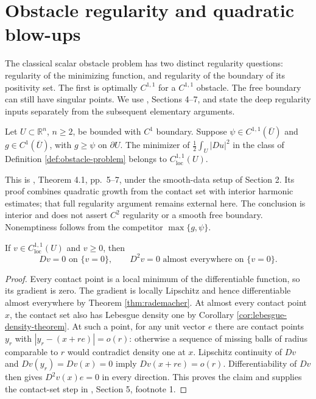 \chapter{Obstacle regularity and quadratic blow-ups}\label{sec:obstacle-blowups}
The classical scalar obstacle problem has two distinct regularity questions: regularity of the minimizing function, and regularity of the boundary of its positivity set. The first is optimally $C^{1,1}$ for a $C^{1,1}$ obstacle. The free boundary can still have singular points. We use \cite{Fig18}, Sections 4--7, and state the deep regularity inputs separately from the subsequent elementary arguments.

\begin{theorem}\label{thm:obstacle-optimal-regularity}
Let $U\subset\mathbb R^n$, $n\geq2$, be bounded with $C^1$ boundary. Suppose $\psi\in C^{1,1}(\overline U)$ and $g\in C^1(\overline U)$, with $g\geq\psi$ on $\partial U$. The minimizer of $\frac12\int_U|Du|^2$ in the class of Definition \ref{def:obstacle-problem} belongs to $C^{1,1}_{\mathrm{loc}}(U)$.

This is \cite{Fig18}, Theorem 4.1, pp.~5--7, under the smooth-data setup of Section 2. Its proof combines quadratic growth from the contact set with interior harmonic estimates; that full regularity argument remains external here. The conclusion is interior and does not assert $C^2$ regularity or a smooth free boundary. Nonemptiness follows from the competitor $\max\{g,\psi\}$.
\end{theorem}

\begin{lemma}\label{lem:contact-hessian-zero}
If $v\in C^{1,1}_{\mathrm{loc}}(U)$ and $v\geq0$, then
\[
 Dv=0\text{ on }\{v=0\},\qquad
 D^2v=0\text{ almost everywhere on }\{v=0\}.
\]
\end{lemma}
\begin{proof}
Every contact point is a local minimum of the differentiable function, so its gradient is zero. The gradient is locally Lipschitz and hence differentiable almost everywhere by Theorem \ref{thm:rademacher}. At almost every contact point $x$, the contact set also has Lebesgue density one by Corollary \ref{cor:lebesgue-density-theorem}. At such a point, for any unit vector $e$ there are contact points $y_r$ with $|y_r-(x+re)|=o(r)$: otherwise a sequence of missing balls of radius comparable to $r$ would contradict density one at $x$. Lipschitz continuity of $Dv$ and $Dv(y_r)=Dv(x)=0$ imply $Dv(x+re)=o(r)$. Differentiability of $Dv$ then gives $D^2v(x)e=0$ in every direction. This proves the claim and supplies the contact-set step in \cite{Fig18}, Section 5, footnote 1.
\end{proof}

